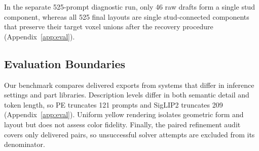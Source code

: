 In the separate 525-prompt diagnostic run, only 46 raw drafts form a single stud component, whereas all 525 final layouts are single stud-connected components that preserve their target voxel unions after the recovery procedure (Appendix~\ref{app:eval}).

\subsection{Evaluation Boundaries}
Our benchmark compares delivered exports from systems that differ in inference settings and part libraries. Description levels differ in both semantic detail and token length, so PE truncates 121 prompts and SigLIP2 truncates 209 (Appendix~\ref{app:eval}). Uniform yellow rendering isolates geometric form and layout but does not assess color fidelity. Finally, the paired refinement audit covers only delivered pairs, so unsuccessful solver attempts are excluded from its denominator.
